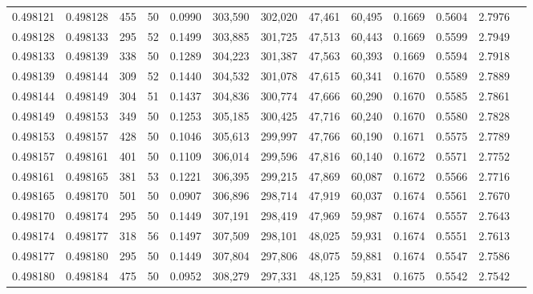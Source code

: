 \begin{tabular}{rrrrrrrrrrrrr}
0.498121 & 0.498128 & 455 &  50 &                                     0.0990 & 303,590 & 302,020 &  47,461 &  60,495 & 0.1669 & 0.5604 & 2.7976 \\
0.498128 & 0.498133 & 295 &  52 &                                     0.1499 & 303,885 & 301,725 &  47,513 &  60,443 & 0.1669 & 0.5599 & 2.7949 \\
0.498133 & 0.498139 & 338 &  50 &                                     0.1289 & 304,223 & 301,387 &  47,563 &  60,393 & 0.1669 & 0.5594 & 2.7918 \\
0.498139 & 0.498144 & 309 &  52 &                                     0.1440 & 304,532 & 301,078 &  47,615 &  60,341 & 0.1670 & 0.5589 & 2.7889 \\
0.498144 & 0.498149 & 304 &  51 &                                     0.1437 & 304,836 & 300,774 &  47,666 &  60,290 & 0.1670 & 0.5585 & 2.7861 \\
0.498149 & 0.498153 & 349 &  50 &                                     0.1253 & 305,185 & 300,425 &  47,716 &  60,240 & 0.1670 & 0.5580 & 2.7828 \\
0.498153 & 0.498157 & 428 &  50 &                                     0.1046 & 305,613 & 299,997 &  47,766 &  60,190 & 0.1671 & 0.5575 & 2.7789 \\
0.498157 & 0.498161 & 401 &  50 &                                     0.1109 & 306,014 & 299,596 &  47,816 &  60,140 & 0.1672 & 0.5571 & 2.7752 \\
0.498161 & 0.498165 & 381 &  53 &                                     0.1221 & 306,395 & 299,215 &  47,869 &  60,087 & 0.1672 & 0.5566 & 2.7716 \\
0.498165 & 0.498170 & 501 &  50 &                                     0.0907 & 306,896 & 298,714 &  47,919 &  60,037 & 0.1674 & 0.5561 & 2.7670 \\
0.498170 & 0.498174 & 295 &  50 &                                     0.1449 & 307,191 & 298,419 &  47,969 &  59,987 & 0.1674 & 0.5557 & 2.7643 \\
0.498174 & 0.498177 & 318 &  56 &                                     0.1497 & 307,509 & 298,101 &  48,025 &  59,931 & 0.1674 & 0.5551 & 2.7613 \\
0.498177 & 0.498180 & 295 &  50 &                                     0.1449 & 307,804 & 297,806 &  48,075 &  59,881 & 0.1674 & 0.5547 & 2.7586 \\
0.498180 & 0.498184 & 475 &  50 &                                     0.0952 & 308,279 & 297,331 &  48,125 &  59,831 & 0.1675 & 0.5542 & 2.7542 \\

\end{tabular}
